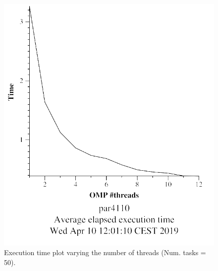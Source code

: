 \documentclass[12pt, a4paper]{article}
\begin{document}
\begin{figure}[H]
\centering
\begin{minipage}[b]{0.4\linewidth}
  \centering
  \includegraphics[scale=0.5]{./mandel-omp-10000-strong-omp-3-50-time}
  \caption{Execution time plot varying the number of threads (Num. tasks = 50).}
  \label{fig:mandel-omp-10000-strong-omp-3-50-time}
\end{minipage}%
\hspace{0.5cm}
\begin{minipage}[b]{0.4\linewidth}
  \centering

\end{minipage}
\end{figure}
\end{document}
